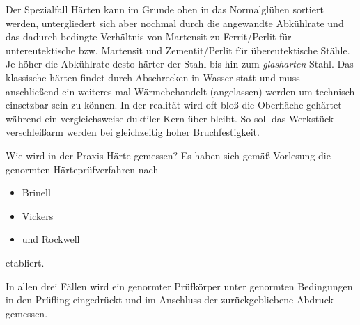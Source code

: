 {\begin{table}[h]
\end{table}
}

Der Spezialfall Härten kann im Grunde oben in das Normalglühen sortiert werden, untergliedert sich aber nochmal durch die
angewandte Abkühlrate und das dadurch bedingte Verhältnis von Martensit zu Ferrit/Perlit für untereutektische bzw. Martensit
und Zementit/Perlit für übereutektische Stähle. Je höher die Abkühlrate desto härter der Stahl bis hin zum \textit{glasharten}
Stahl. Das klassische härten findet durch Abschrecken in Wasser statt und muss anschließend ein weiteres mal Wärmebehandelt
(angelassen) werden um technisch einsetzbar sein zu können. In der realität wird oft bloß die Oberfläche gehärtet
während ein vergleichsweise duktiler Kern über bleibt. So soll das Werkstück verschleißarm werden bei gleichzeitig hoher
Bruchfestigkeit.\newpage

Wie wird in der Praxis Härte gemessen?
Es haben sich gemäß Vorlesung die genormten Härteprüfverfahren nach
\begin{itemize}
    \item Brinell
    \item Vickers
    \item und Rockwell
\end{itemize}
etabliert.\par\medskip

In allen drei Fällen wird ein genormter Prüfkörper unter genormten Bedingungen in den Prüfling eingedrückt und im Anschluss
der zurückgebliebene Abdruck gemessen.

